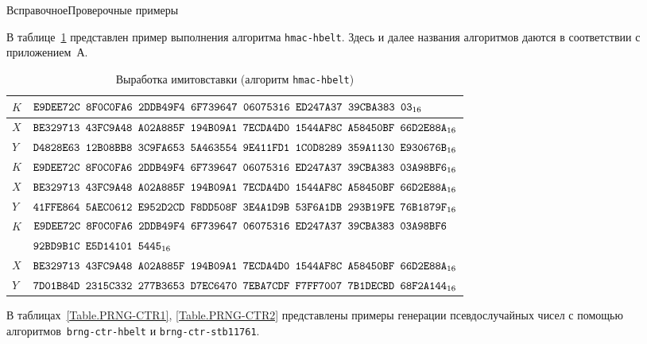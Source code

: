 \begin{appendix}{В}{справочное}{Проверочные примеры}
\label{TEST}


В таблице~\ref{Table.HMAC} представлен пример выполнения 
алгоритма \texttt{hmac-hbelt}. Здесь и далее названия алгоритмов 
даются в соответствии с приложением~А.

\begin{table}[H]
\caption{Выработка имитовставки (алгоритм \texttt{hmac-hbelt})}\label{Table.HMAC}
\begin{tabular}{|l|l|}
%
\hline
$K$ & 
$\texttt{E9DEE72C~8F0C0FA6~2DDB49F4~6F739647~06075316~ED247A37~39CBA383~03}_{16}$\\
%
\hline
$X$ & 
$\texttt{BE329713~43FC9A48~A02A885F~194B09A1~7ECDA4D0~1544AF8C~A58450BF~66D2E88A}_{16}$\\
\hline
\hline
$Y$ & 
$\texttt{D4828E63~12B08BB8~3C9FA653~5A463554~9E411FD1~1C0D8289~359A1130~E930676B}_{16}$\\
\hline
\hline
$K$ & 
$\texttt{E9DEE72C~8F0C0FA6~2DDB49F4~6F739647~06075316~ED247A37~39CBA383~03A98BF6}_{16}$\\
%
\hline
$X$ & 
$\texttt{BE329713~43FC9A48~A02A885F~194B09A1~7ECDA4D0~1544AF8C~A58450BF~66D2E88A}_{16}$\\
\hline
\hline
$Y$ & 
$\texttt{41FFE864~5AEC0612~E952D2CD~F8DD508F~3E4A1D9B~53F6A1DB~293B19FE~76B1879F}_{16}$\\
\hline
\hline
$K$ & 
$\texttt{E9DEE72C~8F0C0FA6~2DDB49F4~6F739647~06075316~ED247A37~39CBA383~03A98BF6}$\\
&
$\texttt{92BD9B1C~E5D14101~5445}_{16}$\\
%
\hline
$X$ & 
$\texttt{BE329713~43FC9A48~A02A885F~194B09A1~7ECDA4D0~1544AF8C~A58450BF~66D2E88A}_{16}$\\
\hline
\hline
$Y$ & 
$\texttt{7D01B84D~2315C332~277B3653~D7EC6470~7EBA7CDF~F7FF7007~7B1DECBD~68F2A144}_{16}$\\
\hline
\end{tabular}
\end{table}


В таблицах~\ref{Table.PRNG-CTR1}, \ref{Table.PRNG-CTR2} 
представлены примеры генерации псевдослучайных чисел 
с помощью алгоритмов~\texttt{brng-ctr-hbelt} и \texttt{brng-ctr-stb11761}.


\end{appendix}
